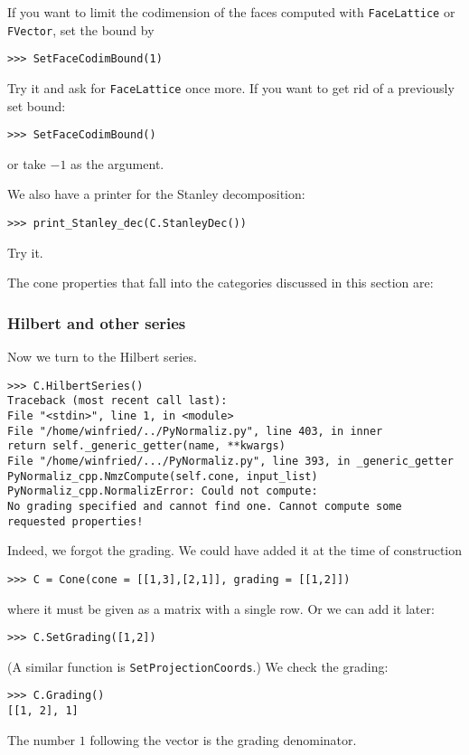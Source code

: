 \begin{small}
If you want to limit the codimension of the faces computed with \verb|FaceLattice| or \verb|FVector|, set the bound by
\begin{Verbatim}
>>> SetFaceCodimBound(1)
\end{Verbatim}
Try it and ask for \verb|FaceLattice| once more. If you want to get rid of a previously set bound:
\begin{Verbatim}
>>> SetFaceCodimBound()
\end{Verbatim}
or take $-1$ as the argument.

We also have a printer for the Stanley decomposition:
\begin{Verbatim}
>>> print_Stanley_dec(C.StanleyDec())
\end{Verbatim}
Try it.

The cone properties that fall into the categories discussed in this section are: 

\subsubsection{Hilbert and other series}

Now we turn to the Hilbert series.
\begin{Verbatim}
>>> C.HilbertSeries()
Traceback (most recent call last):
File "<stdin>", line 1, in <module>
File "/home/winfried/../PyNormaliz.py", line 403, in inner
return self._generic_getter(name, **kwargs)
File "/home/winfried/.../PyNormaliz.py", line 393, in _generic_getter
PyNormaliz_cpp.NmzCompute(self.cone, input_list)
PyNormaliz_cpp.NormalizError: Could not compute: 
No grading specified and cannot find one. Cannot compute some requested properties!
\end{Verbatim}
Indeed, we forgot the grading. We could have added it at the time of construction
\begin{Verbatim}
>>> C = Cone(cone = [[1,3],[2,1]], grading = [[1,2]])
\end{Verbatim}
where it must be given as a matrix with a single row. Or we can add it later:
\begin{Verbatim}
>>> C.SetGrading([1,2])
\end{Verbatim}
(A similar function is \verb|SetProjectionCoords|.) We check the grading:
\begin{Verbatim}
>>> C.Grading()
[[1, 2], 1]
\end{Verbatim}
The number $1$ following the vector is the grading denominator.


\end{small}
